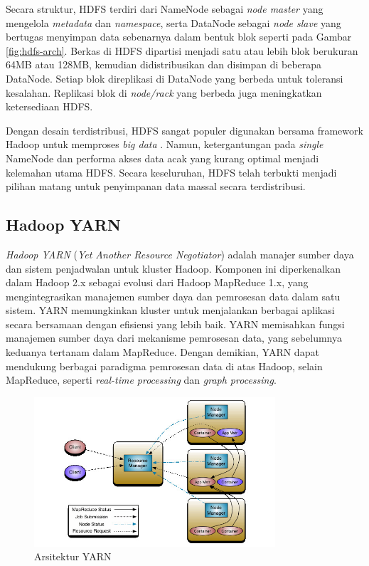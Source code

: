 Secara struktur, HDFS terdiri dari NameNode sebagai \textit{node master} yang mengelola \textit{metadata} dan \textit{namespace}, serta DataNode sebagai \textit{node slave} yang bertugas menyimpan data sebenarnya dalam bentuk blok seperti pada Gambar \ref{fig:hdfs-arch}. Berkas di HDFS dipartisi menjadi satu atau lebih blok berukuran 64MB atau 128MB, kemudian didistribusikan dan disimpan di beberapa DataNode. Setiap blok direplikasi di DataNode yang berbeda untuk toleransi kesalahan. Replikasi blok di \textit{node/rack} yang berbeda juga meningkatkan ketersediaan HDFS.

Dengan desain terdistribusi, HDFS sangat populer digunakan bersama framework Hadoop untuk memproses \textit{big data} \cite{almansouriHadoopDistributedFile2019}. Namun, ketergantungan pada \textit{single} NameNode dan performa akses data acak yang kurang optimal menjadi kelemahan utama HDFS. Secara keseluruhan, HDFS telah terbukti menjadi pilihan matang untuk penyimpanan data massal secara terdistribusi.

\subsection{Hadoop YARN}
\textit{Hadoop YARN} (\textit{Yet Another Resource Negotiator}) adalah manajer sumber daya dan sistem penjadwalan untuk kluster Hadoop. Komponen ini diperkenalkan dalam Hadoop 2.x sebagai evolusi dari Hadoop MapReduce 1.x, yang mengintegrasikan manajemen sumber daya dan pemrosesan data dalam satu sistem. YARN memungkinkan kluster untuk menjalankan berbagai aplikasi secara bersamaan dengan efisiensi yang lebih baik.  YARN memisahkan fungsi manajemen sumber daya dari mekanisme pemrosesan data, yang sebelumnya keduanya tertanam dalam MapReduce. Dengan demikian, YARN dapat mendukung berbagai paradigma pemrosesan data di atas Hadoop, selain MapReduce, seperti \textit{real-time processing} dan \textit{graph processing}.

\begin{figure}[h!]
    \centering
    \includegraphics[width=0.8\textwidth]{figures/ch02/yarn-arch}
    \caption{Arsitektur YARN \cite{ApacheHadoopApache}}
    \label{fig:yarn_arch}
\end{figure}

